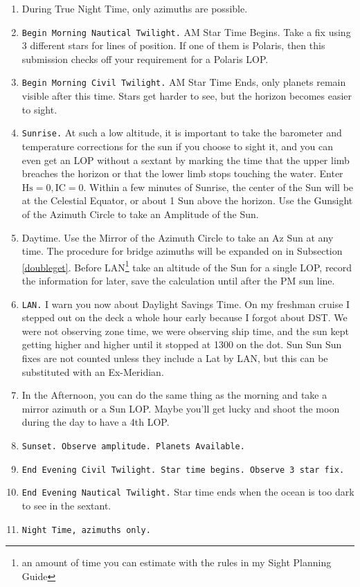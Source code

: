 \documentclass[letterpaper,12pt]{article}
\begin{document}
\begin{enumerate}
\item During True Night Time, only azimuths are possible.
\item \texttt{Begin Morning Nautical Twilight.}
AM Star Time Begins.
Take a fix using 3 different stars for lines of position.
If one of them is Polaris, then this submission checks off your requirement for a Polaris LOP.
\item \texttt{Begin Morning Civil Twilight.}
AM Star Time Ends, only planets remain visible after this time.
Stars get harder to see, but the horizon becomes easier to sight.
    \item \texttt{Sunrise.}
	    At such a low altitude, it is important to take the barometer and temperature corrections for the sun if you choose to sight it, and you can even get an LOP without a sextant by marking the time that the upper limb breaches the horizon or that the lower limb stops touching the water.
	    Enter \(\text{Hs}=0, \text{IC}=0\).
	    Within a few minutes of Sunrise, the center of the Sun will be at the Celestial Equator, or about 1 Sun above the horizon.
	    Use the Gunsight of the Azimuth Circle to take an Amplitude of the Sun.
    \item Daytime.
	    Use the Mirror of the Azimuth Circle to take an Az Sun at any time.
	    The procedure for bridge azimuths will be expanded on in Subsection \ref{doubleget}.
	    Before LAN\footnote{an amount of time you can estimate with the rules in my Sight Planning Guide} take an altitude of the Sun for a single LOP, record the information for later, save the calculation until after the PM sun line.
    \item \texttt{LAN.}
	    I warn you now about Daylight Savings Time.
	    On my freshman cruise I stepped out on the deck a whole hour early because I forgot about DST.
	    We were not observing zone time, we were observing ship time, and the sun kept getting higher and higher until it stopped at 1300 on the dot.
	    Sun Sun Sun fixes are not counted unless they include a Lat by LAN, but this can be substituted with an Ex-Meridian.
    \item In the Afternoon, you can do the same thing as the morning and take a mirror azimuth or a Sun LOP.
	    Maybe you'll get lucky and shoot the moon during the day to have a 4th LOP.
    \item \texttt{Sunset.
	    Observe amplitude.
    Planets Available.}
    \item \texttt{End Evening Civil Twilight.
	    Star time begins.
    Observe 3 star fix.}
\item \texttt{End Evening Nautical Twilight.}
Star time ends when the ocean is too dark to see in the sextant. 
    \item \texttt{Night Time, azimuths only.}
\end{enumerate}
\end{document}
